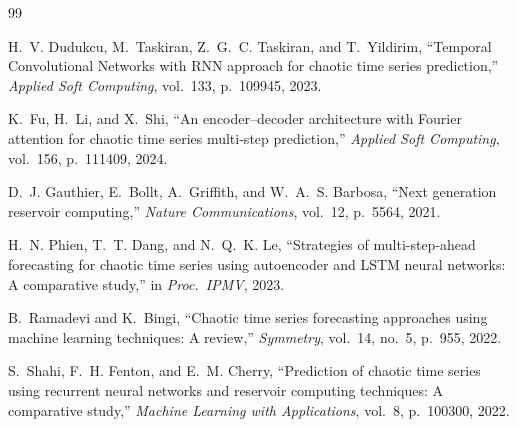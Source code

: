 \documentclass[11pt,a4paper]{article}
\begin{document}
\begin{thebibliography}{99}

H.~V. Dudukcu, M.~Taskiran, Z.~G.~C. Taskiran, and T.~Yildirim, ``Temporal Convolutional Networks with RNN approach for chaotic time series prediction,'' \emph{Applied Soft Computing}, vol.~133, p.~109945, 2023.

K.~Fu, H.~Li, and X.~Shi, ``An encoder--decoder architecture with Fourier attention for chaotic time series multi-step prediction,'' \emph{Applied Soft Computing}, vol.~156, p.~111409, 2024.

D.~J. Gauthier, E.~Bollt, A.~Griffith, and W.~A.~S. Barbosa, ``Next generation reservoir computing,'' \emph{Nature Communications}, vol.~12, p.~5564, 2021.

H.~N. Phien, T.~T. Dang, and N.~Q.~K. Le, ``Strategies of multi-step-ahead forecasting for chaotic time series using autoencoder and LSTM neural networks: A comparative study,'' in \emph{Proc.\ IPMV}, 2023.

B.~Ramadevi and K.~Bingi, ``Chaotic time series forecasting approaches using machine learning techniques: A review,'' \emph{Symmetry}, vol.~14, no.~5, p.~955, 2022.

S.~Shahi, F.~H. Fenton, and E.~M. Cherry, ``Prediction of chaotic time series using recurrent neural networks and reservoir computing techniques: A comparative study,'' \emph{Machine Learning with Applications}, vol.~8, p.~100300, 2022.

\end{thebibliography}
\end{document}
